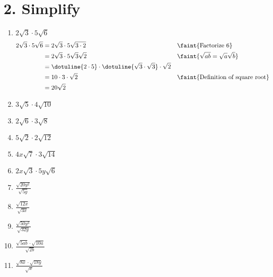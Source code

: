 \documentclass{hw}
\begin{document}
\section*{\normalsize 2. Simplify}
    \begin{enumerate}[label=\alph*.]
        \item $2\sqrt{3} \cdot 5\sqrt{6}$
            \textcolor{blue}{
            \begin{align*}
                2\sqrt{3} \cdot 5\sqrt{6} &= 2\sqrt{3} \cdot 5\sqrt{3 \cdot 2} & \leaders\hbox{A}\hfill & \faint{\text{Factorize } 6} \\
                                          &= 2\sqrt{3} \cdot 5\sqrt{3}\sqrt{2} && \faint{\sqrt{ab} = \sqrt{a}\sqrt{b}} \\
                                          &= \dotuline{2 \cdot 5} \cdot \dotuline{\sqrt{3} \cdot \sqrt{3}} \cdot \sqrt{2} \\ 
                                          &= 10 \cdot 3 \cdot \sqrt{2} && \faint{\text{Definition of square root}} \\
                                          &= 20 \sqrt{2}
            \end{align*}
            }
        \item $3\sqrt{5} \cdot 4\sqrt{10}$
            \studentxlargeworkspace
        \item $2\sqrt{6} \cdot 3\sqrt{8}$
            \studentxlargeworkspace
        \item $5\sqrt{2} \cdot 2\sqrt{12}$
            \studentxlargeworkspace
        \item $4x\sqrt{7} \cdot 3\sqrt{14}$
            \studentxlargeworkspace
        \item $2x\sqrt{3} \cdot 5y\sqrt{6}$
            \studentxlargeworkspace
        \item $\frac{\sqrt{20y^2}}{\sqrt{5y}}$
            \studentxlargeworkspace
        \item $\frac{\sqrt{12x}}{\sqrt{3x}}$
            \studentxlargeworkspace
        \item $\frac{\sqrt{50y^3}}{\sqrt{32y}}$
            \studentxlargeworkspace
        \item $\frac{\sqrt{5ab} \cdot \sqrt{10a}}{\sqrt{2b}}$
            \studentxlargeworkspace
        \item $\frac{\sqrt{8x} \cdot \sqrt{18y}}{\sqrt{x}}$
            \studentxlargeworkspace
    \end{enumerate} 
\end{document}
